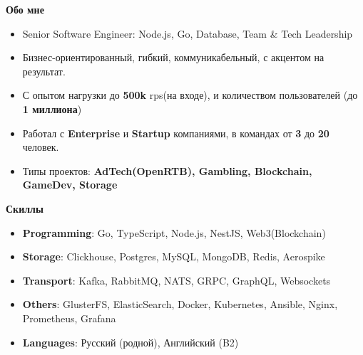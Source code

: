 \documentclass{resume}
\begin{document}

\begin{rSection}{\textbf{Обо мне}}
{
    \begin{itemize}
    \setlength\itemsep{-0.2em}
        \item Senior Software Engineer: Node.js, Go, Database, Team \& Tech Leadership
        \item Бизнес-ориентированный, гибкий, коммуникабельный, с акцентом на результат.
        \item С опытом нагрузки до \textbf{500k} rps(на входе), и количеством пользователей (до \textbf{1 миллиона})
        \item Работал с \textbf{Enterprise} и \textbf{Startup} компаниями, в командах от \textbf{3} до \textbf{20} человек.
        \item Типы проектов: \textbf{AdTech(OpenRTB), Gambling, Blockchain, GameDev, Storage}
    \end{itemize}
}

\end{rSection}
\begin{rSection}{\textbf{Скиллы}}
    \begin{itemize}
    \setlength\itemsep{-0.2em}
        \item \textbf{Programming}: Go, TypeScript, Node.js, NestJS, Web3(Blockchain)
        \item \textbf{Storage}: Clickhouse, Postgres, MySQL, MongoDB, Redis, Aerospike
        \item \textbf{Transport}: Kafka, RabbitMQ, NATS, GRPC, GraphQL, Websockets
        \item \textbf{Others}: GlusterFS, ElasticSearch, Docker, Kubernetes, Ansible, Nginx, Prometheus, Grafana
        \item \textbf{Languages}: Русский (родной), Английский (B2)
    \end{itemize}
\end{rSection}
\end{document}
